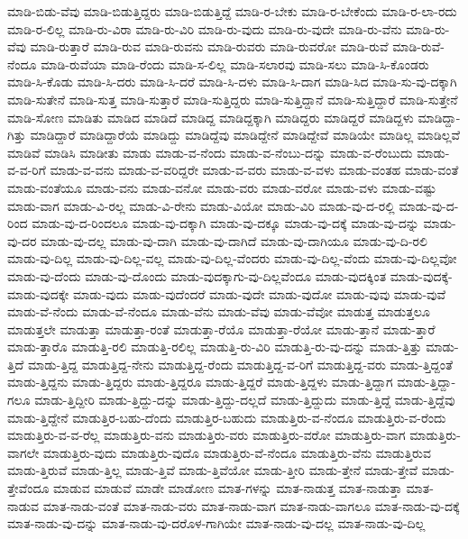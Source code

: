 {ಮಾಡಿ-ಬಿಡು-ವೆವು
ಮಾಡಿ-ಬಿಡುತ್ತಿದ್ದರು
ಮಾಡಿ-ಬಿಡುತ್ತಿದ್ದೆ
ಮಾಡಿ-ರ-ಬೇಕು
ಮಾಡಿ-ರ-ಬೇಕೆಂದು
ಮಾಡಿ-ರ-ಲಾ-ರದು
ಮಾಡಿ-ರ-ಲಿಲ್ಲ
ಮಾಡಿ-ರು-ವಿರಾ
ಮಾಡಿ-ರು-ವಿರಿ
ಮಾಡಿ-ರು-ವುದು
ಮಾಡಿ-ರು-ವುದೇ
ಮಾಡಿ-ರು-ವೆನು
ಮಾಡಿ-ರು-ವೆವು
ಮಾಡಿ-ರುತ್ತಾರೆ
ಮಾಡಿ-ರುವ
ಮಾಡಿ-ರುವನು
ಮಾಡಿ-ರುವರು
ಮಾಡಿ-ರುವರೋ
ಮಾಡಿ-ರುವೆ
ಮಾಡಿ-ರುವೆ-ನೆಂದೂ
ಮಾಡಿ-ರುವೆಯಾ
ಮಾಡಿ-ರೆಂದು
ಮಾಡಿ-ಸ-ಲಿಲ್ಲ
ಮಾಡಿ-ಸಲಾರವು
ಮಾಡಿ-ಸಲು
ಮಾಡಿ-ಸಿ-ಕೊಂಡರು
ಮಾಡಿ-ಸಿ-ಕೊಡು
ಮಾಡಿ-ಸಿ-ದರು
ಮಾಡಿ-ಸಿ-ದರೆ
ಮಾಡಿ-ಸಿ-ದಳು
ಮಾಡಿ-ಸಿ-ದಾಗ
ಮಾಡಿ-ಸಿದ
ಮಾಡಿ-ಸು-ವು-ದಕ್ಕಾಗಿ
ಮಾಡಿ-ಸುತೇನೆ
ಮಾಡಿ-ಸುತ್ತ
ಮಾಡಿ-ಸುತ್ತಾರೆ
ಮಾಡಿ-ಸುತ್ತಿದ್ದರು
ಮಾಡಿ-ಸುತ್ತಿದ್ದಾನೆ
ಮಾಡಿ-ಸುತ್ತಿದ್ದಾರೆ
ಮಾಡಿ-ಸುತ್ತೇನೆ
ಮಾಡಿ-ಸೋಣ
ಮಾಡಿತು
ಮಾಡಿದ
ಮಾಡಿದೆ
ಮಾಡಿದ್ದ
ಮಾಡಿದ್ದಕ್ಕಾಗಿ
ಮಾಡಿದ್ದರು
ಮಾಡಿದ್ದರೆ
ಮಾಡಿದ್ದಳು
ಮಾಡಿದ್ದಾ-ಗಿತ್ತು
ಮಾಡಿದ್ದಾರೆ
ಮಾಡಿದ್ದಾರೆಯೆ
ಮಾಡಿದ್ದು
ಮಾಡಿದ್ದೆವು
ಮಾಡಿದ್ದೇನೆ
ಮಾಡಿದ್ದೇವೆ
ಮಾಡಿಯೇ
ಮಾಡಿಲ್ಲ
ಮಾಡಿಲ್ಲವೆ
ಮಾಡಿವೆ
ಮಾಡಿಸಿ
ಮಾಡೀತು
ಮಾಡು
ಮಾಡು-ವ-ನೆಂದು
ಮಾಡು-ವ-ನೆಂಬು-ದನ್ನು
ಮಾಡು-ವ-ರೆಂಬುದು
ಮಾಡು-ವ-ವ-ರಿಗೆ
ಮಾಡು-ವ-ವನು
ಮಾಡು-ವ-ವರಿದ್ದರೇ
ಮಾಡು-ವ-ವರು
ಮಾಡು-ವ-ವಳು
ಮಾಡು-ವಂತಹ
ಮಾಡು-ವಂತೆ
ಮಾಡು-ವಂತೆಯೂ
ಮಾಡು-ವನು
ಮಾಡು-ವನೋ
ಮಾಡು-ವರು
ಮಾಡು-ವರೋ
ಮಾಡು-ವಳು
ಮಾಡು-ವಷ್ಟು
ಮಾಡು-ವಾಗ
ಮಾಡು-ವಿ-ರಲ್ಲ
ಮಾಡು-ವಿ-ರೇನು
ಮಾಡು-ವಿಯೋ
ಮಾಡು-ವಿರಿ
ಮಾಡು-ವು-ದ-ರಲ್ಲಿ
ಮಾಡು-ವು-ದ-ರಿಂದ
ಮಾಡು-ವು-ದ-ರಿಂದಲೂ
ಮಾಡು-ವು-ದಕ್ಕಾಗಿ
ಮಾಡು-ವು-ದಕ್ಕೂ
ಮಾಡು-ವು-ದಕ್ಕೆ
ಮಾಡು-ವು-ದನ್ನು
ಮಾಡು-ವು-ದರ
ಮಾಡು-ವು-ದಲ್ಲ
ಮಾಡು-ವು-ದಾಗಿ
ಮಾಡು-ವು-ದಾಗಿದೆ
ಮಾಡು-ವು-ದಾಗಿಯೂ
ಮಾಡು-ವು-ದಿ-ರಲಿ
ಮಾಡು-ವು-ದಿಲ್ಲ
ಮಾಡು-ವು-ದಿಲ್ಲ-ವಲ್ಲ
ಮಾಡು-ವು-ದಿಲ್ಲ-ವೆಂದರು
ಮಾಡು-ವು-ದಿಲ್ಲ-ವೆಂದು
ಮಾಡು-ವು-ದಿಲ್ಲವೋ
ಮಾಡು-ವು-ದೆಂದು
ಮಾಡು-ವು-ದೊಂದು
ಮಾಡು-ವುದಕ್ಕಾಗು-ವು-ದಿಲ್ಲವೆಂದೂ
ಮಾಡು-ವುದಕ್ಕಿಂತ
ಮಾಡು-ವುದಕ್ಕೆ-
ಮಾಡು-ವುದಕ್ಕೇ
ಮಾಡು-ವುದು
ಮಾಡು-ವುದೆಂದರೆ
ಮಾಡು-ವುದೇ
ಮಾಡು-ವುದೋ
ಮಾಡು-ವುವು
ಮಾಡು-ವುವೆ
ಮಾಡು-ವೆ-ನೆಂದು
ಮಾಡು-ವೆ-ನೆಂದೂ
ಮಾಡು-ವೆನು
ಮಾಡು-ವೆವು
ಮಾಡು-ವೆವೋ
ಮಾಡುತ್ತ
ಮಾಡುತ್ತಲೂ
ಮಾಡುತ್ತಲೇ
ಮಾಡುತ್ತಾ
ಮಾಡುತ್ತಾ-ರಂತೆ
ಮಾಡುತ್ತಾ-ರೆಯೊ
ಮಾಡುತ್ತಾ-ರೆಯೋ
ಮಾಡು-ತ್ತಾನೆ
ಮಾಡು-ತ್ತಾರೆ
ಮಾಡು-ತ್ತಾರೊ
ಮಾಡುತ್ತಿ-ರಲಿ
ಮಾಡುತ್ತಿ-ರಲಿಲ್ಲ
ಮಾಡುತ್ತಿ-ರು-ವಿರಿ
ಮಾಡುತ್ತಿ-ರು-ವು-ದನ್ನು
ಮಾಡು-ತ್ತಿತ್ತು
ಮಾಡು-ತ್ತಿದೆ
ಮಾಡು-ತ್ತಿದ್ದ
ಮಾಡುತ್ತಿದ್ದ-ನೇನು
ಮಾಡುತ್ತಿದ್ದ-ರೆಂದು
ಮಾಡುತ್ತಿದ್ದ-ವ-ರಿಗೆ
ಮಾಡುತ್ತಿದ್ದ-ವರು
ಮಾಡು-ತ್ತಿದ್ದಂತೆ
ಮಾಡು-ತ್ತಿದ್ದನು
ಮಾಡು-ತ್ತಿದ್ದರು
ಮಾಡು-ತ್ತಿದ್ದರೂ
ಮಾಡು-ತ್ತಿದ್ದರೆ
ಮಾಡು-ತ್ತಿದ್ದಳು
ಮಾಡು-ತ್ತಿದ್ದಾಗ
ಮಾಡು-ತ್ತಿದ್ದಾ-ಗಲೂ
ಮಾಡು-ತ್ತಿದ್ದೀರಿ
ಮಾಡು-ತ್ತಿದ್ದು-ದನ್ನು
ಮಾಡು-ತ್ತಿದ್ದು-ದಲ್ಲದೆ
ಮಾಡು-ತ್ತಿದ್ದುದು
ಮಾಡು-ತ್ತಿದ್ದೆ
ಮಾಡು-ತ್ತಿದ್ದೆವು
ಮಾಡು-ತ್ತಿದ್ದೇನೆ
ಮಾಡುತ್ತಿರ-ಬಹು-ದೆಂದು
ಮಾಡುತ್ತಿರ-ಬಹುದು
ಮಾಡುತ್ತಿರು-ವ-ನೆಂದೂ
ಮಾಡುತ್ತಿರು-ವ-ರೆಂದು
ಮಾಡುತ್ತಿರು-ವ-ವ-ರೆಲ್ಲ
ಮಾಡುತ್ತಿರು-ವನು
ಮಾಡುತ್ತಿರು-ವರು
ಮಾಡುತ್ತಿರು-ವರೋ
ಮಾಡುತ್ತಿರು-ವಾಗ
ಮಾಡುತ್ತಿರು-ವಾಗಲೇ
ಮಾಡುತ್ತಿರು-ವುದು
ಮಾಡುತ್ತಿರು-ವುದೊ
ಮಾಡುತ್ತಿರು-ವೆ-ನೆಂದೂ
ಮಾಡುತ್ತಿರು-ವೆನು
ಮಾಡುತ್ತಿರುವ
ಮಾಡು-ತ್ತಿರುವೆ
ಮಾಡು-ತ್ತಿಲ್ಲ
ಮಾಡು-ತ್ತಿವೆ
ಮಾಡು-ತ್ತಿವೆಯೋ
ಮಾಡು-ತ್ತೀರಿ
ಮಾಡು-ತ್ತೇನೆ
ಮಾಡು-ತ್ತೇವೆ
ಮಾಡು-ತ್ತೇವೆಂದೂ
ಮಾಡುವ
ಮಾಡುವೆ
ಮಾಡೇ
ಮಾಡೋಣ
ಮಾತ-ಗಳನ್ನು
ಮಾತ-ನಾಡುತ್ತ
ಮಾತ-ನಾಡುತ್ತಾ
ಮಾತ-ನಾಡುವ
ಮಾತ-ನಾಡು-ವಂತೆ
ಮಾತ-ನಾಡು-ವರು
ಮಾತ-ನಾಡು-ವಾಗ
ಮಾತ-ನಾಡು-ವಾಗಲೂ
ಮಾತ-ನಾಡು-ವು-ದಕ್ಕೆ
ಮಾತ-ನಾಡು-ವು-ದನ್ನು
ಮಾತ-ನಾಡು-ವು-ದರೊಳ-ಗಾಗಿಯೇ
ಮಾತ-ನಾಡು-ವು-ದಲ್ಲ
ಮಾತ-ನಾಡು-ವು-ದಿಲ್ಲ
}
